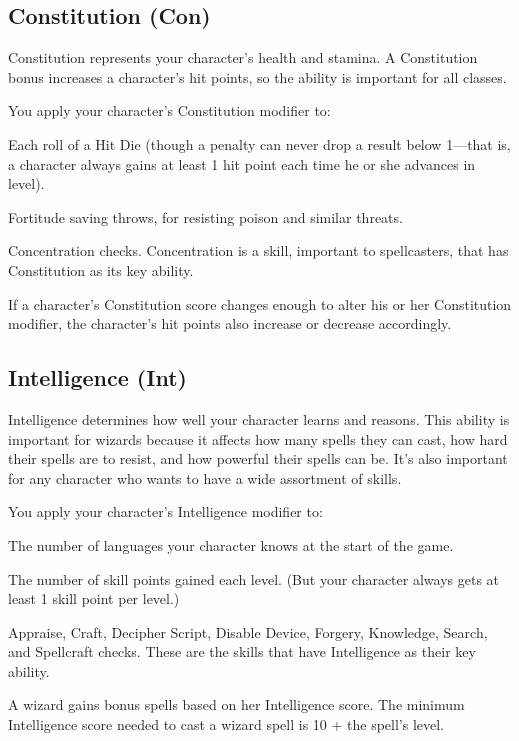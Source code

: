 \subsection{Constitution (Con)}
Constitution represents your character's health and stamina. A Constitution bonus increases a character's hit points, so the ability is important for all classes.

You apply your character's Constitution modifier to:
\begin{itemize*}
\item Each roll of a Hit Die (though a penalty can never drop a result below 1---that is, a character always gains at least 1 hit point each time he or she advances in level).
\item Fortitude saving throws, for resisting poison and similar threats.
\item Concentration checks. Concentration is a skill, important to spellcasters, that has Constitution as its key ability.
\end{itemize*}

If a character's Constitution score changes enough to alter his or her Constitution modifier, the character's hit points also increase or decrease accordingly.

\subsection{Intelligence (Int)}
Intelligence determines how well your character learns and reasons. This ability is important for wizards because it affects how many spells they can cast, how hard their spells are to resist, and how powerful their spells can be. It's also important for any character who wants to have a wide assortment of skills.

You apply your character's Intelligence modifier to:
\begin{itemize*}
\item The number of languages your character knows at the start of the game.
\item The number of skill points gained each level. (But your character always gets at least 1 skill point per level.)
\item Appraise, Craft, Decipher Script, Disable Device, Forgery, Knowledge, Search, and Spellcraft checks. These are the skills that have Intelligence as their key ability.
\end{itemize*}

A wizard gains bonus spells based on her Intelligence score. The minimum Intelligence score needed to cast a wizard spell is 10 + the spell's level.

